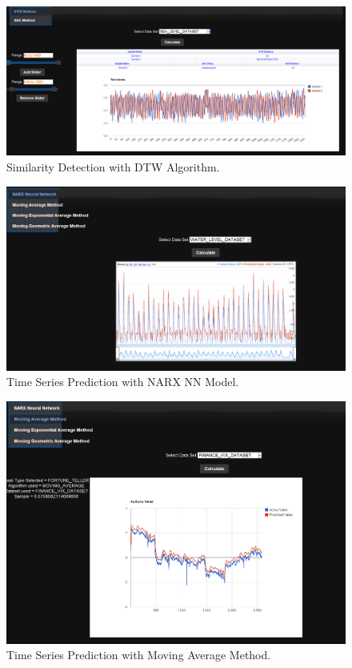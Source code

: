 \documentclass[12pt]{report}
\begin{document}
\begin{figure}[h!]
  
  \centering
    \includegraphics[scale=0.35]{./screenshots/sim_dtw.png}
\caption{Similarity Detection with DTW Algorithm.}
\end{figure}

\begin{figure}[h!]
  
  \centering
    \includegraphics[scale=0.40]{./screenshots/ft_narx.png}
\caption{Time Series Prediction with NARX NN Model.}
\end{figure}
\begin{figure}[h!]
  
  \centering
    \includegraphics[scale=0.400]{./screenshots/ft_mv_avg.png}
\caption{Time Series Prediction with Moving Average Method.}
\end{figure}
\end{document}
